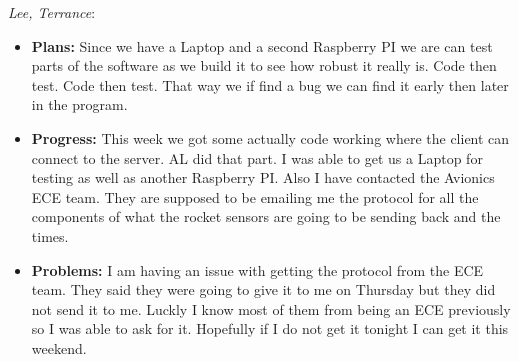 \documentclass[10pt,draftclsnofoot,onecolumn]{IEEEtran}
\newcommand{\subsubsubsection}[1]{
	\hfill\break\textit{#1}:
}
\begin{document}
\subsubsubsection{Lee, Terrance}
\begin{itemize}
	\item \textbf{Plans: }
	Since we have a Laptop and a second Raspberry PI we are can test parts of the software as we build it to see how robust it really is. Code then test. Code then test. That way we if find a bug we can find it early then later in the program.
	\item \textbf{Progress: }
	This week we got some actually code working where the client can connect to the server. AL did that part. I was able to get us a Laptop for testing as well as another Raspberry PI. Also I have contacted the Avionics ECE team. They are supposed to be emailing me the protocol for all the components of what the rocket sensors are going to be sending back and the times.
	\item \textbf{Problems: }
	I am having an issue with getting the protocol from the ECE team. They said they were going to give it to me on Thursday but they did not send it to me. Luckly I know most of them from being an ECE previously so I was able to ask for it. Hopefully if I do not get it tonight I can get it this weekend.
\end{itemize}
\end{document}
